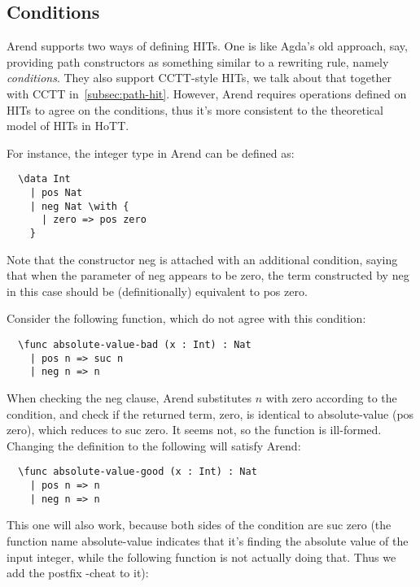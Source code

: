 \subsection{Conditions}
\label{subsec:conditions}

Arend supports two ways of defining HITs.
One is like Agda's old approach, say, providing path constructors
as something similar to a rewriting rule, namely \textit{conditions}.
They also support CCTT-style HITs, we talk about that together with
CCTT in~\cref{subsec:path-hit}.
However, Arend requires operations defined on HITs to agree on the conditions,
thus it's more consistent to the theoretical model of HITs in HoTT.

For instance, the integer type in Arend can be defined as:

\begin{verbatim}
  \data Int
    | pos Nat
    | neg Nat \with {
      | zero => pos zero
    }
\end{verbatim}

Note that the constructor \textsf{neg} is attached with an additional
condition, saying that when the parameter of
\textsf{neg} appears to be \textsf{zero},
the term constructed by \textsf{neg} in this case should be
(definitionally) equivalent to \textsf{pos zero}.

Consider the following function, which do not agree with this condition:

\begin{verbatim}
  \func absolute-value-bad (x : Int) : Nat
    | pos n => suc n
    | neg n => n
\end{verbatim}

When checking the \textsf{neg} clause, Arend substitutes $n$ with
\textsf{zero} according to the condition, and check if the returned
term, \textsf{zero}, is identical to
\textsf{absolute-value (pos zero)}, which reduces to \textsf{suc zero}.
It seems not, so the function is ill-formed.
Changing the definition to the following will satisfy Arend:

\begin{verbatim}
  \func absolute-value-good (x : Int) : Nat
    | pos n => n
    | neg n => n
\end{verbatim}

This one will also work, because both sides of the condition
are \textsf{suc zero}
(the function name \textsf{absolute-value} indicates that it's finding
the absolute value of the input integer, while the following function
is not actually doing that.
Thus we add the postfix \textsf{-cheat} to it):

